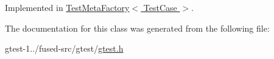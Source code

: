 \-Implemented in \hyperlink{classtesting_1_1internal_1_1TestMetaFactory_acee8d75dcd9b3a90c2f685caf5211605}{\-Test\-Meta\-Factory$<$ Test\-Case $>$}.



\-The documentation for this class was generated from the following file\-:\begin{DoxyCompactItemize}
\item 
gtest-\/1../fused-\/src/gtest/\hyperlink{fused-src_2gtest_2gtest_8h}{gtest.\-h}\end{DoxyCompactItemize}
